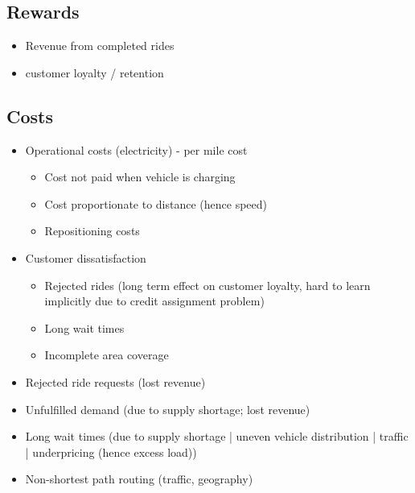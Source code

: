 \documentclass[12pt]{article}
\begin{document}
\subsection*{Rewards}
\begin{itemize}
		\item Revenue from completed rides
		\item {} customer loyalty / retention
\end{itemize}
\subsection*{Costs}
\begin{itemize}
		\item Operational costs (electricity) - per mile cost
				\begin{itemize}
						\item Cost not paid when vehicle is charging
						\item Cost proportionate to distance (hence speed)
                        \item Repositioning costs
				\end{itemize}
		\item Customer dissatisfaction
				\begin{itemize}
						\item Rejected rides (long term effect on customer loyalty, hard to learn
								implicitly due to credit assignment problem)
						\item Long wait times
                        \item Incomplete area coverage
				\end{itemize}
\end{itemize}
\begin{itemize}
		\item Rejected ride requests (lost revenue)
		\item Unfulfilled demand (due to supply shortage; lost revenue)
		\item Long wait times (due to supply shortage | uneven vehicle distribution | traffic |
				underpricing (hence excess load))
		\item Non-shortest path routing (traffic, geography)
\end{itemize}

\newpage
\end{document}
